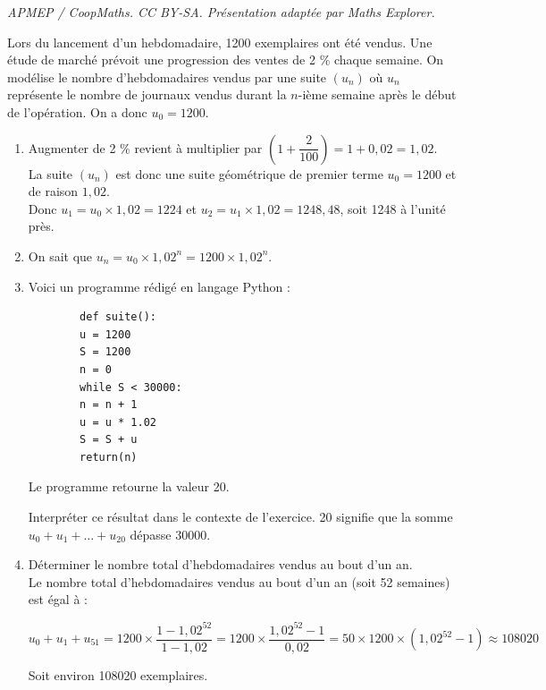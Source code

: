 \documentclass[10pt]{article}
\begin{document}
\noindent\textit{APMEP / CoopMaths. CC BY-SA. Présentation adaptée par Maths Explorer.}\par\medskip
Lors du lancement d’un hebdomadaire, 1200 exemplaires ont été vendus. Une étude de marché prévoit une progression des ventes de 2 \% chaque semaine. On modélise le nombre d’hebdomadaires vendus par une suite $(u_n)$ où $u_n$ représente le nombre de journaux vendus durant la $n$-ième semaine après le début de l’opération. On a donc $u_0 = 1200$.

\begin{enumerate}
	\item 	Augmenter de 2 \% revient à multiplier par $\left(1 + \dfrac{2}{100}\right) = 1 + 0,02 = 1,02$.\\
	 La suite $(u_n)$ est donc une suite géométrique de premier terme $u_0 = 1200$ et de raison $1,02$.\\
	  Donc $u_1 = u_0 \times 1,02 = 1224$ et $u_2 = u_1 \times 1,02 = 1248,48$, soit 1248 à l’unité près.
	
	\item	On sait que $u_n = u_0 \times 1,02^n = 1200 \times 1,02^n$.
	
	\item	Voici un programme rédigé en langage Python :
	
	\begin{verbatim}
		def suite():
		u = 1200
		S = 1200
		n = 0
		while S < 30000:
		n = n + 1
		u = u * 1.02
		S = S + u
		return(n)
	\end{verbatim}
	
	Le programme retourne la valeur 20.
	
	Interpréter ce résultat dans le contexte de l’exercice. 20 signifie que la somme $u_0 + u_1 + \ldots + u_{20}$ dépasse 30000.
	
	\item 	Déterminer le nombre total d’hebdomadaires vendus au bout d’un an.\\
	Le nombre total d’hebdomadaires vendus au bout d’un an (soit 52 semaines) est égal à :
	
	\[
	u_0 + u_1 + u_{51} = 1200 \times \dfrac{1 - 1,02^{52}}{1 - 1,02} = 1200 \times \dfrac{1,02^{52} - 1}{0,02} = 50 \times 1200 \times (1,02^{52} - 1) \approx 108020
	\]
	
	Soit environ 108020 exemplaires.
\end{enumerate}
\end{document}
